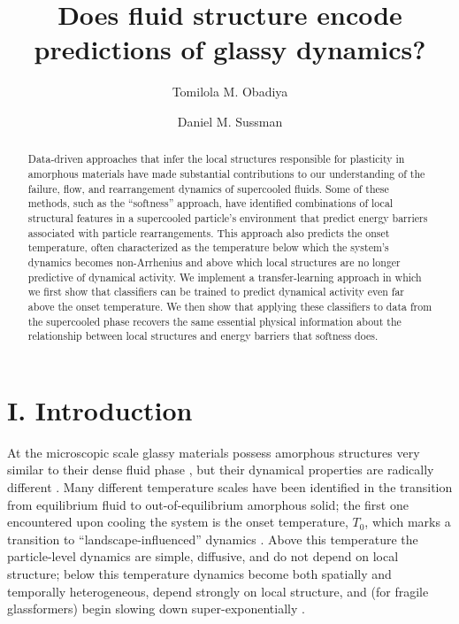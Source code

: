 \documentclass[aps,reprint,superscriptaddress,nofootinbib, notitlepage,prl]{revtex4-2}
\begin{document}
\frenchspacing

\title{Does fluid structure encode predictions of glassy dynamics?}
\author{Tomilola M. Obadiya}
\author{Daniel M. Sussman}

\begin{abstract}
Data-driven approaches that infer the local structures responsible for plasticity in amorphous materials have made substantial contributions to our understanding of the failure, flow, and rearrangement dynamics of supercooled fluids. Some of these methods, such as the ``softness'' approach, have identified combinations of local structural features in a supercooled particle's environment that predict energy barriers associated with particle rearrangements. This approach also predicts the onset temperature, often characterized as the temperature below which the system's dynamics becomes non-Arrhenius and above which local structures are no longer predictive of dynamical activity. We implement a transfer-learning approach in which we first show that classifiers can be trained to predict dynamical activity even far above the onset temperature. We then show that applying these classifiers to data from the supercooled phase recovers the same essential physical information about the relationship between local structures and energy barriers that softness does.
\end{abstract}  


\maketitle

%
%
\section{I. Introduction}
%
%

At the microscopic scale glassy materials possess amorphous structures very similar to their dense fluid phase \cite{berthier2011dynamic}, but their dynamical properties are radically different \cite{angell1995formation}. Many different temperature scales have been identified in the transition from equilibrium fluid to out-of-equilibrium amorphous solid; the first one encountered upon cooling the system is the onset temperature, $T_0$, which marks a transition to ``landscape-influenced'' dynamics  \cite{sastry1998signatures,debenedetti2001supercooled,banerjee2017determination,folena2020rethinking}. Above this temperature the particle-level dynamics are simple, diffusive, and do not depend on local structure; below this temperature dynamics become both spatially and temporally heterogeneous, depend strongly on local structure, and (for fragile glassformers) begin slowing down super-exponentially \cite{keys2011excitations, ediger2000spatially, berthier2011dynamical, ediger1996supercooled,pedersen2018phase}. 
\end{document}
